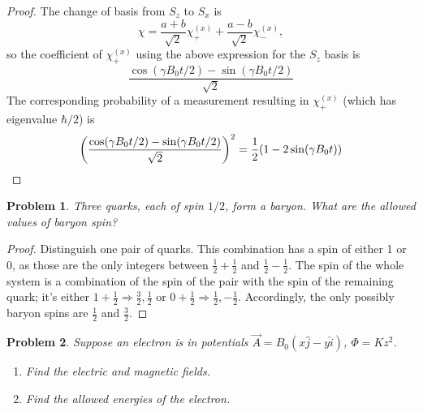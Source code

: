 \documentclass{article}
\newtheorem{plm}{Problem}
\begin{document}
\begin{proof}
  The change of basis from $S_{z}$ to $S_{x}$ is
  \[
    \chi = \frac{a + b}{\sqrt{2}}\chi_{+}^{(x)} + \frac{a - b}{\sqrt{2}}\chi_{-}^{(x)},
  \]
  so the coefficient of $\chi_{+}^{(x)}$ using the above expression for the $S_{z}$ basis is
  \[
    \frac{\cos(\gamma B_{0}t / 2) - \sin(\gamma B_{0}t/2)}{\sqrt{2}}
  \]
  The corresponding probability of a measurement resulting in $\chi_{+}^{(x)}$ (which has eigenvalue $\hbar/2$) is
  \[
    \qty(\frac{\cos(\gamma B_{0}t / 2) - \sin(\gamma B_{0}t/2)}{\sqrt{2}})^{2} = \frac{1}{2}\qty(1 - 2\sin(\gamma B_{0}t))
  \]
\end{proof}

\begin{plm}
  Three quarks, each of spin $1/2$, form a baryon.
  What are the allowed values of baryon spin?
\end{plm}

\begin{proof}
  Distinguish one pair of quarks.
  This combination has a spin of either 1 or 0, as those are the only integers between $\frac{1}{2} + \frac{1}{2}$ and $\frac{1}{2} - \frac{1}{2}$.
  The spin of the whole system is a combination of the spin of the pair with the spin of the remaining quark;
  it's either $1 + \frac{1}{2} \Rightarrow \frac{3}{2}, \frac{1}{2}$ or $0 + \frac{1}{2} \Rightarrow \frac{1}{2}, -\frac{1}{2}$.
  Accordingly, the only possibly baryon spins are $\frac{1}{2}$ and $\frac{3}{2}$.
\end{proof}

\begin{plm}
  Suppose an electron is in potentials $\vec{A} = B_{0}(x\hat{j} - y\hat{i})$, $\Phi = Kz^{2}$.
  \begin{enumerate}
  \item Find the electric and magnetic fields.
  \item Find the allowed energies of the electron.
  \end{enumerate}
\end{plm}
\end{document}
